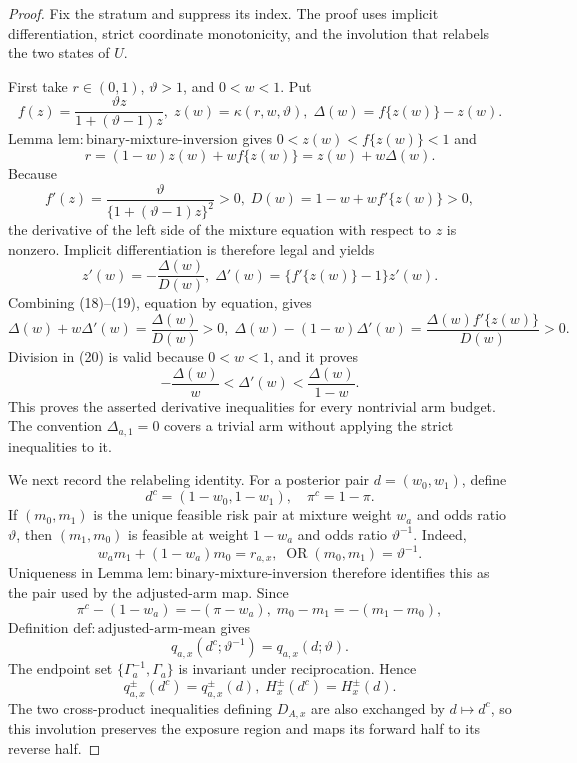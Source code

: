 \documentclass{article}
\begin{document}
\begin{proof}
Fix the stratum and suppress its index.  The proof uses implicit differentiation, strict coordinate monotonicity, and the involution that relabels the two states of \(U\).

First take \(r\in(0,1)\), \(\vartheta>1\), and \(0<w<1\).  Put
\[
 f(z)=\frac{\vartheta z}{1+(\vartheta-1)z},
 \; z(w)=\kappa(r,w,\vartheta),
 \; \Delta(w)=f\{z(w)\}-z(w).
 \tag{16}
\]
Lemma \(\mathrm{lem{:}binary\text{-}mixture\text{-}inversion}\) gives \(0<z(w)<f\{z(w)\}<1\) and
\[
 r=(1-w)z(w)+wf\{z(w)\}=z(w)+w\Delta(w).
 \tag{17}
\]
Because
\[
 f'(z)=\frac{\vartheta}{\{1+(\vartheta-1)z\}^2}>0,
 \;
 D(w)=1-w+wf'\{z(w)\}>0,
 \tag{18}
\]
the derivative of the left side of the mixture equation with respect to \(z\) is nonzero.  Implicit differentiation is therefore legal and yields
\[
 z'(w)=-\frac{\Delta(w)}{D(w)},
 \;
 \Delta'(w)=\{f'\{z(w)\}-1\}z'(w).
 \tag{19}
\]
Combining (18)--(19), equation by equation, gives
\[
 \Delta(w)+w\Delta'(w)=\frac{\Delta(w)}{D(w)}>0,
 \;
 \Delta(w)-(1-w)\Delta'(w)
 =\frac{\Delta(w)f'\{z(w)\}}{D(w)}>0.
 \tag{20}
\]
Division in (20) is valid because \(0<w<1\), and it proves
\[
 -\frac{\Delta(w)}{w}<\Delta'(w)
 <\frac{\Delta(w)}{1-w}.
 \tag{21}
\]
This proves the asserted derivative inequalities for every nontrivial arm budget.  The convention \(\Delta_{a,1}=0\) covers a trivial arm without applying the strict inequalities to it.

We next record the relabeling identity.  For a posterior pair \(d=(w_0,w_1)\), define
\[
 d^c=(1-w_0,1-w_1),\quad \pi^c=1-\pi.
 \tag{22}
\]
If \((m_0,m_1)\) is the unique feasible risk pair at mixture weight \(w_a\) and odds ratio \(\vartheta\), then \((m_1,m_0)\) is feasible at weight \(1-w_a\) and odds ratio \(\vartheta^{-1}\).  Indeed,
\[
 w_am_1+(1-w_a)m_0=r_{a,x},
 \;
 \operatorname{OR}(m_0,m_1)=\vartheta^{-1}.
 \tag{23}
\]
Uniqueness in Lemma \(\mathrm{lem{:}binary\text{-}mixture\text{-}inversion}\) therefore identifies this as the pair used by the adjusted-arm map.  Since
\[
 \pi^c-(1-w_a)=-(\pi-w_a),
 \; m_0-m_1=-(m_1-m_0),
\]
Definition \(\mathrm{def{:}adjusted\text{-}arm\text{-}mean}\) gives
\[
 q_{a,x}(d^c;\vartheta^{-1})=q_{a,x}(d;\vartheta).
 \tag{24}
\]
The endpoint set \(\{\Gamma_a^{-1},\Gamma_a\}\) is invariant under reciprocation.  Hence
\[
 q_{a,x}^{\pm}(d^c)=q_{a,x}^{\pm}(d),
 \; H_x^{\pm}(d^c)=H_x^{\pm}(d).
 \tag{25}
\]
The two cross-product inequalities defining \(D_{A,x}\) are also exchanged by \(d\mapsto d^c\), so this involution preserves the exposure region and maps its forward half to its reverse half.


\end{proof}
\end{document}

